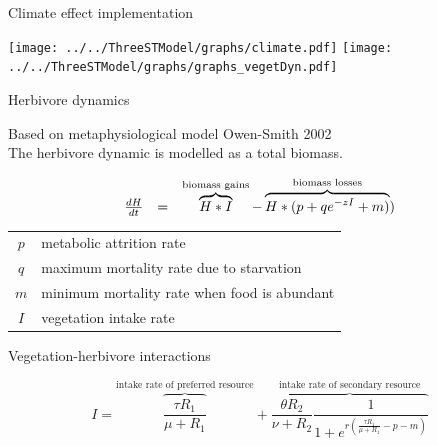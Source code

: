 \documentclass[10pt,aspectratio=149]{beamer}
\begin{document}
\begin{frame}{Climate effect implementation}

\centering
\texttt{[image: ../../ThreeSTModel/graphs/climate.pdf]}
\texttt{[image: ../../ThreeSTModel/graphs/graphs\_vegetDyn.pdf]}
  

\end{frame}

\begin{frame}{Herbivore dynamics}

Based on metaphysiological model Owen-Smith 2002\\

The herbivore dynamic is modelled as a \alert{total biomass}.

\[
\left.
\begin{array}{r c l}{}

\frac{dH}{dt} &=& 
\overbrace{H*I}^\text{biomass gains} - \overbrace{H*(p+qe^{-zI}+m)}^\text{biomass losses})

\end{array}
\right.
\]

\vspace{2em}

\small{
\begin{tabular}{cl}
$p$ & metabolic attrition rate \\

$q$ & maximum mortality rate due to starvation \\

$m$ & minimum mortality rate when food is abundant \\

$I$ & vegetation intake rate \\
\end{tabular}
}

\end{frame}

\begin{frame}{Vegetation-herbivore interactions}

\[
I = \overbrace{\frac{\tau R_1}{\mu+R_1}}^\text{intake rate of preferred resource} 
+ \overbrace{\frac{\theta R_2}{\nu+R_2}\frac{1}{1+e^{r(\frac{\tau R_1}{\mu+R_1} - p - m)}}}^\text{intake rate of secondary resource} 
\]

 

\end{frame}
\end{document}
